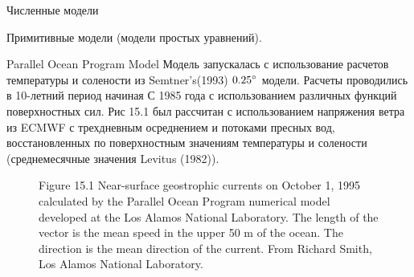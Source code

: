 \begin{chapter}{Численные модели}
\begin{section}{Примитивные модели (модели простых уравнений).}
\begin{paragraph}{Parallel Ocean Program Model}
Модель запускалась с использование расчетов температуры и солености из
Semtner's(1993) ${0.25}^\circ$ модели. Расчеты проводились в 10-летний период
начиная С 1985 года с использованием различных функций поверхностных
сил. Рис 15.1 был рассчитан с использованием напряжения ветра из ECMWF
с трехдневным осреднением и потоками пресных вод, восстановленных по
поверхностным значениям температуры и солености (среднемесячные
значения Levitus (1982)).
\end{paragraph}

\begin{figure}[t!]
\caption{Figure 15.1 Near-surface geostrophic
currents on
October 1, 1995 calculated by the Parallel Ocean Program numerical
model developed at the Los Alamos National Laboratory. The length of
the vector is the mean speed in the upper 50 m of the ocean. The
direction is the mean direction of the current. From Richard Smith,
Los Alamos National Laboratory.}
\label{fig:model_out}

\end{figure}
\end{section}
\end{chapter}
